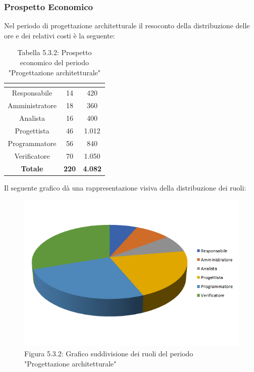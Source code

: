 \subsubsection{Prospetto Economico}
Nel periodo di progettazione architetturale il resoconto della distribuzione delle ore e dei relativi costi è la seguente:

\renewcommand{\arraystretch}{1.5}
\begin{table}[H]
\begin{center}
\begin{tabular}{|c|c|c|}
\hline
\rowcolor{title_row}
\textbf{\color{title_text}{Ruolo}}  & \textbf{\color{title_text}{Ore}} & \textbf{\color{title_text}{Costo in \euro}} \\ \hline
Responsabile    & 14              & 420                     \\ \hline
Amministratore  & 18              & 360                   \\ \hline
Analista        & 16              & 400                    \\ \hline
Progettista     & 46              & 1.012                     \\ \hline
Programmatore   & 56              & 840                     \\ \hline
Verificatore    & 70              & 1.050                    \\ \hline
\textbf{Totale} & \textbf{220}    & \textbf{4.082}         \\ \hline
\end{tabular}
\caption{Tabella 5.3.2: Prospetto economico del periodo "Progettazione architetturale"\label{}}
\end{center}
\end{table}
\renewcommand{\arraystretch}{1}

Il seguente grafico dà una rappresentazione visiva della distribuzione dei ruoli: \\
\begin{figure} [H]
	\centering
	\includegraphics[scale=1]{Res/ExcelGrafici/Grafici/ProgettazioneRuoli.png}
	\caption{Figura 5.3.2: Grafico suddivisione dei ruoli del periodo "Progettazione architetturale"}\label{}
\end{figure}

\pagebreak
